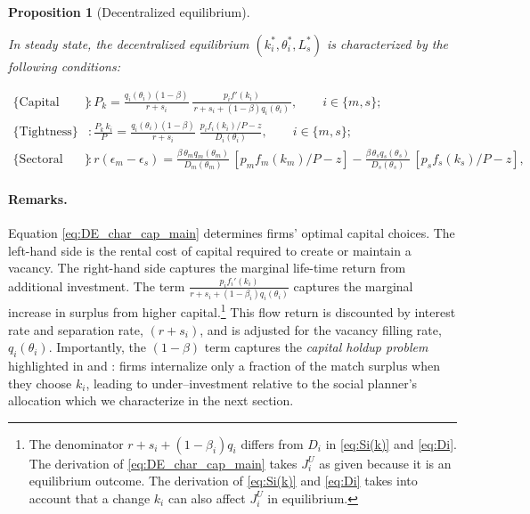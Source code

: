 \documentclass[12pt]{article} %
\newtheorem{proposition}{Proposition}
\theoremstyle{definition}
\begin{document}
\begin{proposition}[Decentralized equilibrium]
\label{prop:DE}


In steady state, the decentralized equilibrium  $(k^*_i, \theta^*_i, L^*_s)$  is characterized by the following conditions:

\begin{align}
\{\text{Capital choice}\}&:  P_k  = \frac{q_i(\theta_i)(1-\beta)}{r+s_i}\,\frac{p_i f'(k_i)}{\,r+s_i+(1-\beta)q_i(\theta_i)\,},  
\qquad i\in\{m,s\};
\label{eq:DE_char_cap_main}\\
\{ \text{Tightness} \}&:  \frac{P_{k} \, k_i }{P}
= \frac{q_i(\theta_i)(1-\beta)}{r+s_i} \;
  \frac{p_i f_i(k_i)/P-z}
       {D_i(\theta_i)}, \qquad i\in\{m,s\};
\label{eq:DE_char_theta_main}\\
\{\text{Sectoral choice}\}&: r(\epsilon_m-\epsilon_s)
= \frac{\beta\,\theta_m q_m(\theta_m)}{D_m(\theta_m)}\,[p_m f_m(k_m)/P- z]
-\frac{\beta\,\theta_s q_s(\theta_s)}{D_s(\theta_s)}\,[p_s f_s(k_s)/P- z], \label{eq:DE_char_edu_main}
\end{align}

\end{proposition}



\paragraph{Remarks.}  
  Equation \eqref{eq:DE_char_cap_main} determines firms' optimal capital choices. The left-hand side is the rental cost of capital required to create or maintain a vacancy. The right-hand side captures the marginal life-time return from additional investment.  The term $\frac{p_if_i'(k_i)}{r+s_i+(1-\beta_i)q_i(\theta_i)}$ captures the marginal increase in  surplus from higher capital.\footnote{The denominator $r+s_i+(1-\beta_i)q_i$ differs from $D_i$ in \eqref{eq:Si(k)} and \eqref{eq:Di}. The derivation of \eqref{eq:DE_char_cap_main} takes $J^U_i$ as given because it is an equilibrium outcome. The derivation of  \eqref{eq:Si(k)} and \eqref{eq:Di} takes into account that a change $k_i$ can also affect $J^U_i$ in equilibrium.  }  This flow return is discounted by interest rate and separation rate, $(r+s_i)$, and is adjusted for the vacancy filling rate, $q_i(\theta_i)$. Importantly, the  $(1-\beta)$ term captures the  \emph{capital holdup problem} highlighted in \cite{acemoglu1999holdups} and \cite{cardullo2015sunk}: firms internalize only a fraction of the match surplus when they choose $k_i$, leading to under–investment relative to the social planner's allocation which we characterize in the next section. 
  
\end{document}
